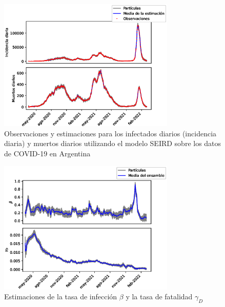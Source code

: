 \begin{figure}[h]
    \centering
    \includegraphics[width=0.75\textwidth]{figs/seird_online_em_aug_state_state_vars_arg_data.eps}
    \caption{Observaciones y estimaciones para los infectados diarios (incidencia diaria) y muertos diarios utilizando el modelo SEIRD sobre los datos de COVID-19 en Argentina}
    \label{fig:seird_vars_arg_data}
\end{figure}
\begin{figure}[h]
    \centering
    \includegraphics[width=0.75\textwidth]{figs/seird_online_em_aug_state_params_arg_data.eps}
    \caption{Estimaciones de la tasa de infección $\beta$ y la tasa de fatalidad $\gamma_D$}
    \label{fig:seird_params_arg_data}
\end{figure}
